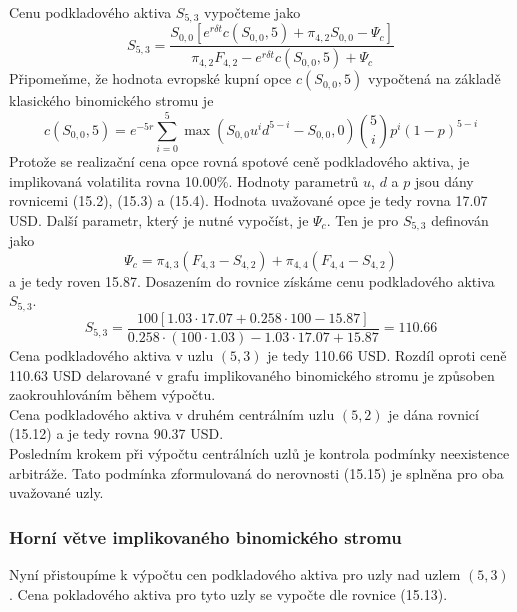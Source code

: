 \documentclass[a4paper]{book}
\begin{document}
Cenu podkladového aktiva $S_{5,3}$ vypočteme jako
\begin{equation*}
S_{5,3} = \frac{S_{0,0}[e^{r \delta t}c(S_{0,0},5)+ \pi_{4,2}S_{0,0}-\Psi_c]}{\pi_{4,2}F_{4,2}-e^{r \delta t}c(S_{0,0},5)+\Psi_c}
\end{equation*}
Připomeňme, že hodnota evropské kupní opce $c(S_{0,0},5)$ vypočtená na základě klasického binomického stromu je
\begin{equation*}
c(S_{0,0}, 5) = e^{-5r} \sum_{i = 0}^5 \max(S_{0,0}u^id^{5-i}-S_{0,0},0)\binom{5}{i}p^i(1-p)^{5-i}
\end{equation*}
Protože se realizační cena opce rovná spotové ceně podkladového aktiva, je implikovaná volatilita rovna 10.00\%. Hodnoty parametrů $u$, $d$ a $p$ jsou dány rovnicemi (15.2), (15.3) a (15.4). Hodnota uvažované opce je tedy rovna 17.07 USD. Další parametr, který je nutné vypočíst, je $\Psi_c$. Ten je pro $S_{5,3}$ definován jako
\begin{equation*}
\Psi_c = \pi_{4,3}(F_{4,3}-S_{4,2}) + \pi_{4,4}(F_{4,4}-S_{4,2})
\end{equation*}
a je tedy roven 15.87. Dosazením do rovnice získáme cenu podkladového aktiva $S_{5,3}$.
\begin{equation*}
S_{5,3} = \frac{100[1.03 \cdot 17.07 + 0.258 \cdot 100 - 15.87]}{0.258 \cdot (100 \cdot 1.03) - 1.03 \cdot 17.07 + 15.87} = 110.66
\end{equation*}
Cena podkladového aktiva v uzlu $(5,3)$ je tedy 110.66 USD. Rozdíl oproti ceně 110.63 USD delarované v grafu implikovaného binomického stromu je způsoben zaokrouhlováním během výpočtu.\\

Cena podkladového aktiva v druhém centrálním uzlu $(5,2)$ je dána rovnicí (15.12) a je tedy rovna 90.37 USD.\\

Posledním krokem při výpočtu centrálních uzlů je kontrola podmínky neexistence arbitráže. Tato podmínka zformulovaná do nerovnosti (15.15) je splněna pro oba uvažované uzly.

\subsubsection{Horní větve implikovaného binomického stromu}

Nyní přistoupíme k výpočtu cen podkladového aktiva pro uzly nad uzlem $(5,3)$. Cena pokladového aktiva pro tyto uzly se vypočte dle rovnice (15.13).\\ 
\end{document}
